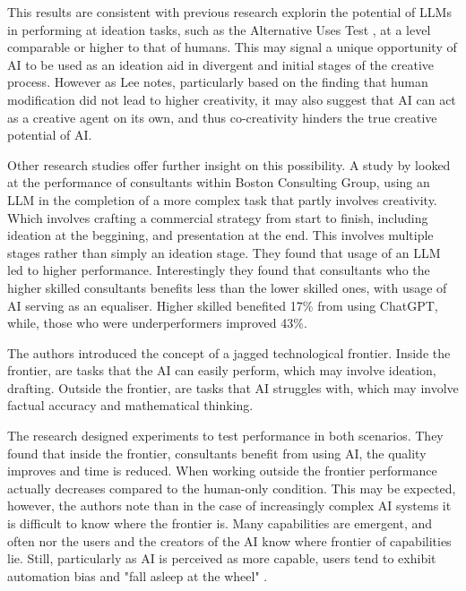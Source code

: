 This results are consistent with previous research explorin the potential of LLMs in performing at ideation tasks, such as the Alternative Uses Test \cite{Hubert2024-kv, Haase2023-vz, Guzik2023-cl}, at a level comparable or higher to that of humans. This may signal a unique opportunity of AI to be used as an ideation aid in divergent and initial stages of the creative process. However as Lee \cite{Lee2024-hd} notes, particularly based on the finding that human modification did not lead to higher creativity, it may also suggest that AI can act as a creative agent on its own, and thus co-creativity hinders the true creative potential of AI. 

Other research studies offer further insight on this possibility. A study by \cite{DellAcqua2023-og} looked at the performance of consultants within Boston Consulting Group, using an LLM in the completion of a more complex task that partly involves creativity. Which involves crafting a commercial strategy from start to finish, including ideation at the beggining, and presentation at the end. This involves multiple stages rather than simply an ideation stage. They found that usage of an LLM led to higher performance. Interestingly they found that consultants who the higher skilled consultants benefits less than the lower skilled ones, with usage of AI serving as an equaliser. Higher skilled benefited 17\% from using ChatGPT, while, those who were underperformers improved 43\%. 

The authors introduced the concept of a jagged technological frontier. Inside the frontier, are tasks that the AI can easily perform, which may involve ideation, drafting. Outside the frontier, are tasks that AI struggles with, which may involve factual accuracy and mathematical thinking. 

The research designed experiments to test performance in both scenarios. They found that inside the frontier, consultants benefit from using AI, the quality improves and time is reduced. When working outside the frontier performance actually decreases compared to the human-only condition. This may be expected, however, the authors note than in the case of increasingly complex AI systems it is difficult to know where the frontier is. Many capabilities are emergent, and often nor the users and the creators of the AI know where frontier of capabilities lie. Still, particularly as AI is perceived as more capable, users tend to exhibit automation bias and "fall asleep at the wheel" \cite{Dell-Acqua2022-dy}. 

